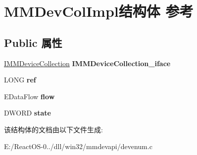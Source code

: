\hypertarget{struct_m_m_dev_col_impl}{}\section{M\+M\+Dev\+Col\+Impl结构体 参考}
\label{struct_m_m_dev_col_impl}
\subsection*{Public 属性}
\begin{DoxyCompactItemize}
\item 
\mbox{\label{struct_m_m_dev_col_impl_ac13a5498b90c4be57b4d354472a3ff16}} 
\hyperlink{interface_i_m_m_device_collection}{I\+M\+M\+Device\+Collection} {\bfseries I\+M\+M\+Device\+Collection\+\_\+iface}
\item 
\mbox{\label{struct_m_m_dev_col_impl_a487bab886a617ffffbe5d9741afb2a4b}} 
L\+O\+NG {\bfseries ref}
\item 
\mbox{\label{struct_m_m_dev_col_impl_af747eb3030b7e191f5147fd04869ef7b}} 
E\+Data\+Flow {\bfseries flow}
\item 
\mbox{\label{struct_m_m_dev_col_impl_af2fee1d9fea7f5fd7456d169c42c251e}} 
D\+W\+O\+RD {\bfseries state}
\end{DoxyCompactItemize}


该结构体的文档由以下文件生成\+:\begin{DoxyCompactItemize}
\item 
E\+:/\+React\+O\+S-\/0../dll/win32/mmdevapi/devenum.\+c\end{DoxyCompactItemize}
